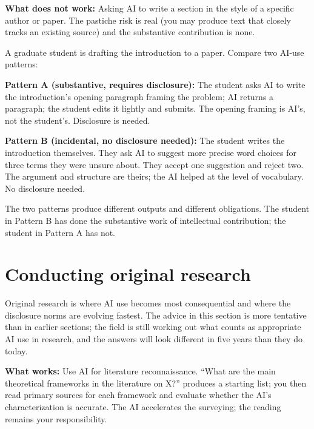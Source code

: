 \documentclass[11pt]{book}
\begin{document}
\textbf{What does not work:} Asking AI to write a section in the style of a specific author or paper. The pastiche risk is real (you may produce text that closely tracks an existing source) and the substantive contribution is none.

\begin{example}
A graduate student is drafting the introduction to a paper. Compare two AI-use patterns:

\medskip
\textbf{Pattern A (substantive, requires disclosure):} The student asks AI to write the introduction's opening paragraph framing the problem; AI returns a paragraph; the student edits it lightly and submits. The opening framing is AI's, not the student's. Disclosure is needed.

\medskip
\textbf{Pattern B (incidental, no disclosure needed):} The student writes the introduction themselves. They ask AI to suggest more precise word choices for three terms they were unsure about. They accept one suggestion and reject two. The argument and structure are theirs; the AI helped at the level of vocabulary. No disclosure needed.

The two patterns produce different outputs and different obligations. The student in Pattern B has done the substantive work of intellectual contribution; the student in Pattern A has not.
\end{example}

\section{Conducting original research}

Original research is where AI use becomes most consequential and where the disclosure norms are evolving fastest. The advice in this section is more tentative than in earlier sections; the field is still working out what counts as appropriate AI use in research, and the answers will look different in five years than they do today.

\textbf{What works:} Use AI for literature reconnaissance. ``What are the main theoretical frameworks in the literature on X?'' produces a starting list; you then read primary sources for each framework and evaluate whether the AI's characterization is accurate. The AI accelerates the surveying; the reading remains your responsibility.
\end{document}
